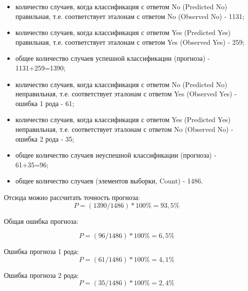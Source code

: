 \begin{itemize}
  \item количество случаев, когда классификация с ответом No (Predicted No) правильная,
  т.е. соответствует эталонам с ответом No (Observed No) - 1131;
  \item количество случаев, когда классификация с ответом Yes (Predicted Yes) правильная,
  т.е. соответствует эталонам с ответом Yes (Observed Yes) - 259;
  \item общее количество случаев успешной классификации (прогноза) - 1131+259=1390;
  \item количество случаев, когда классификация с ответом No (Predicted No)
  неправильная, т.е. соответствует эталонам с ответом Yes (Observed Yes) - ошибка 1
  рода - 61;
  \item количество случаев, когда классификация с ответом Yes (Predicted Yes)
  неправильная, т.е. соответствует эталонам с ответом No (Observed No) - ошибка 2
  рода - 35;
  \item общее количество случаев неуспешной классификации (прогноза) - 61+35=96;
  \item общее количество случаев (элементов выборки, Count) - 1486.
\end{itemize}


Отсюда можно рассчитать точность прогноза:
$$
P = (1390 / 1486) * 100\% = 93,5\%
$$

Общая ошибка прогноза:

$$
P = (96 / 1486) * 100\% = 6,5\%
$$

Ошибка прогноза 1 рода:
$$
P = (61 / 1486) * 100\% = 4,1\%
$$

Ошибка прогноза 2 рода:
$$
P = (35 / 1486) * 100\% = 2,4\%
$$
